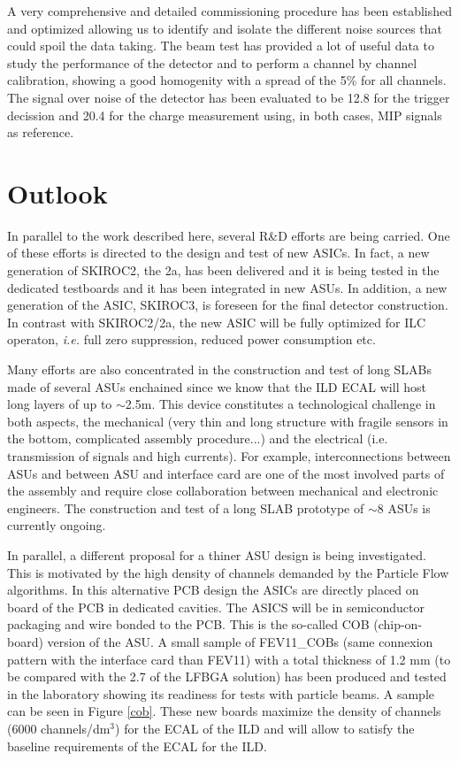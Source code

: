 \documentclass[a4paper,11pt]{article}
\begin{document}
A very comprehensive and detailed commissioning procedure has been established and optimized
allowing us to identify and isolate the different noise sources that could spoil the data taking.
The beam test has provided a lot of useful data to study 
the performance of the detector and to perform
a channel by channel calibration, showing a good homogenity with a spread of the 5\% for all channels.
The signal over noise of the detector has been evaluated to be 12.8 for the trigger
decission and 20.4 for the charge measurement using, in both cases, MIP signals as reference.

\section{Outlook}
\label{sec:outlook}

In parallel to the work described here, several R\&D efforts are being carried.
One of these efforts is directed to the design and test of new ASICs.
In fact, a new generation of SKIROC2, the 2a, has been delivered
and it is being tested in the dedicated testboards and it has been integrated in new ASUs.
In addition, a new generation of the ASIC, SKIROC3, is foreseen for the final detector construction.
In contrast with SKIROC2/2a, the new ASIC will be fully optimized for ILC operaton, {\it i.e.} full zero suppression, reduced power consumption etc.

Many efforts are also concentrated in the construction and test of long SLABs
made of several ASUs enchained since we know that the ILD ECAL will host long layers of up to $\sim$2.5m.
This device constitutes a technological challenge in both aspects, the mechanical
(very thin and long structure with fragile sensors in the bottom, complicated assembly procedure...)
and the electrical (i.e. transmission of signals and high currents).
For example, interconnections between ASUs and between ASU and interface card are one of
the most involved parts of the assembly
and require close collaboration between mechanical and electronic engineers.
The construction and test of a long SLAB prototype
of $\sim8$ ASUs is currently ongoing.

In parallel, a different proposal for a thiner ASU
design is being investigated. This is motivated by the high density of channels
demanded by the Particle Flow algorithms. 
In this alternative PCB design the ASICs
are directly placed on board of the PCB in dedicated cavities.
The ASICS will be in semiconductor packaging and wire bonded to the PCB. This is the so-called COB (chip-on-board) version of the ASU.
A small sample of FEV11\_COBs (same connexion pattern with the interface card than FEV11)
with a total thickness of 1.2 mm (to be compared with the 2.7 of the LFBGA solution)
has been produced and tested in the laboratory
showing its readiness for tests with particle beams. A sample can be seen in Figure \ref{cob}.
These new boards maximize the density of channels (6000 channels/dm$^{3}$) for the ECAL of the ILD
and will allow to satisfy the baseline requirements of the ECAL for the ILD.
\end{document}
